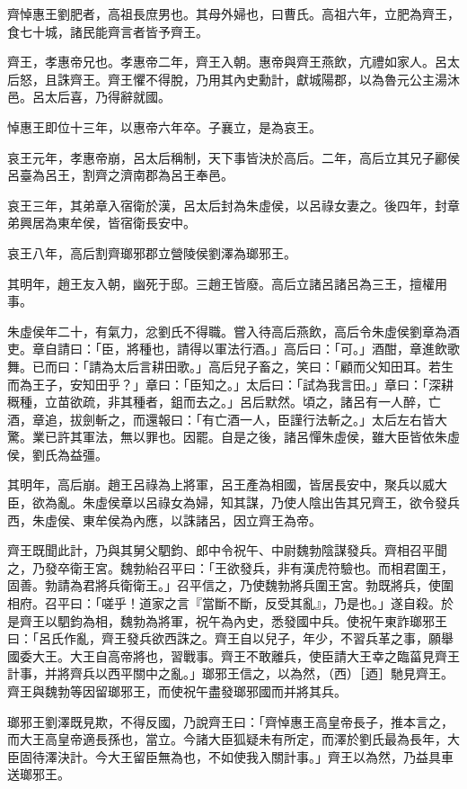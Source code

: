 
\begin{pinyinscope}
齊悼惠王劉肥者，高祖長庶男也。其母外婦也，曰曹氏。高祖六年，立肥為齊王，食七十城，諸民能齊言者皆予齊王。

齊王，孝惠帝兄也。孝惠帝二年，齊王入朝。惠帝與齊王燕飲，亢禮如家人。呂太后怒，且誅齊王。齊王懼不得脫，乃用其內史勳計，獻城陽郡，以為魯元公主湯沐邑。呂太后喜，乃得辭就國。

悼惠王即位十三年，以惠帝六年卒。子襄立，是為哀王。

哀王元年，孝惠帝崩，呂太后稱制，天下事皆決於高后。二年，高后立其兄子酈侯呂臺為呂王，割齊之濟南郡為呂王奉邑。

哀王三年，其弟章入宿衛於漢，呂太后封為朱虛侯，以呂祿女妻之。後四年，封章弟興居為東牟侯，皆宿衛長安中。

哀王八年，高后割齊瑯邪郡立營陵侯劉澤為瑯邪王。

其明年，趙王友入朝，幽死于邸。三趙王皆廢。高后立諸呂諸呂為三王，擅權用事。

朱虛侯年二十，有氣力，忿劉氏不得職。嘗入待高后燕飲，高后令朱虛侯劉章為酒吏。章自請曰：「臣，將種也，請得以軍法行酒。」高后曰：「可。」酒酣，章進飲歌舞。已而曰：「請為太后言耕田歌。」高后兒子畜之，笑曰：「顧而父知田耳。若生而為王子，安知田乎？」章曰：「臣知之。」太后曰：「試為我言田。」章曰：「深耕穊種，立苗欲疏，非其種者，鉏而去之。」呂后默然。頃之，諸呂有一人醉，亡酒，章追，拔劍斬之，而還報曰：「有亡酒一人，臣謹行法斬之。」太后左右皆大驚。業已許其軍法，無以罪也。因罷。自是之後，諸呂憚朱虛侯，雖大臣皆依朱虛侯，劉氏為益彊。

其明年，高后崩。趙王呂祿為上將軍，呂王產為相國，皆居長安中，聚兵以威大臣，欲為亂。朱虛侯章以呂祿女為婦，知其謀，乃使人陰出告其兄齊王，欲令發兵西，朱虛侯、東牟侯為內應，以誅諸呂，因立齊王為帝。

齊王既聞此計，乃與其舅父駟鈞、郎中令祝午、中尉魏勃陰謀發兵。齊相召平聞之，乃發卒衛王宮。魏勃紿召平曰：「王欲發兵，非有漢虎符驗也。而相君圍王，固善。勃請為君將兵衛衛王。」召平信之，乃使魏勃將兵圍王宮。勃既將兵，使圍相府。召平曰：「嗟乎！道家之言『當斷不斷，反受其亂』，乃是也。」遂自殺。於是齊王以駟鈞為相，魏勃為將軍，祝午為內史，悉發國中兵。使祝午東詐瑯邪王曰：「呂氏作亂，齊王發兵欲西誅之。齊王自以兒子，年少，不習兵革之事，願舉國委大王。大王自高帝將也，習戰事。齊王不敢離兵，使臣請大王幸之臨菑見齊王計事，并將齊兵以西平關中之亂。」瑯邪王信之，以為然，（西）［迺］馳見齊王。齊王與魏勃等因留瑯邪王，而使祝午盡發瑯邪國而并將其兵。

瑯邪王劉澤既見欺，不得反國，乃說齊王曰：「齊悼惠王高皇帝長子，推本言之，而大王高皇帝適長孫也，當立。今諸大臣狐疑未有所定，而澤於劉氏最為長年，大臣固待澤決計。今大王留臣無為也，不如使我入關計事。」齊王以為然，乃益具車送瑯邪王。


\end{pinyinscope}
